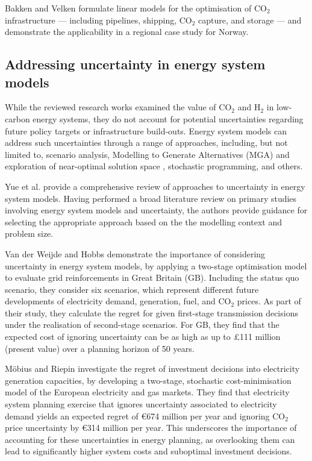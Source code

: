 \documentclass[pdflatex,sn-nature]{sn-jnl}%
\theoremstyle{thmstyleone}%
\theoremstyle{thmstyletwo}%
\theoremstyle{thmstylethree}%
\begin{document}
Bakken and Velken \cite{bakkenLinearModelsOptimization2008} formulate linear models for the optimisation of CO$_2$ infrastructure --- including pipelines, shipping, CO$_2$ capture, and storage --- and demonstrate the applicability in a regional case study for Norway. \cite{birgeValueStochasticSolution1982,birgeIntroductionStochasticProgramming2011,fodstadStochasticModelingNatural2016,vanderweijdeEconomicsPlanningElectricity2012,mobiusRegretAnalysisInvestment2020}

\subsection{Addressing uncertainty in energy system models}\label{sec:uncertainty_in_energy_system_models}
While the reviewed research works examined the value of CO$_2$ and H$_2$ in low-carbon energy systems, they do not account for potential uncertainties regarding future policy targets or infrastructure build-outs. 
Energy system models can address such uncertainties through a range of approaches, including, but not limited to, scenario analysis, Modelling to Generate Alternatives (MGA) and exploration of near-optimal solution space \cite{neumannNearoptimalFeasibleSpace2021,greevenbroekLittleLoseCase2024,priceModellingGenerateAlternatives2017}, stochastic programming, and others. 

Yue et al. \cite{yueReviewApproachesUncertainty2018} provide a comprehensive review of approaches to uncertainty in energy system models. Having performed a broad literature review on primary studies involving energy system models and uncertainty, the authors provide guidance for selecting the appropriate approach based on the the modelling context and problem size.

Van der Weijde and Hobbs \cite{vanderweijdeEconomicsPlanningElectricity2012} demonstrate the importance of considering uncertainty in energy system models, by applying a two-stage optimisation model to evaluate grid reinforcements in Great Britain (GB). Including the status quo scenario, they consider six scenarios, which represent different future developments of electricity demand, generation, fuel, and CO$_2$ prices. As part of their study, they calculate the regret for given first-stage transmission decisions under the realisation of second-stage scenarios. For GB, they find that the expected cost of ignoring uncertainty can be as high as up to \pounds111 million (present value) over a planning horizon of 50 years.

Möbius and Riepin \cite{mobiusRegretAnalysisInvestment2020} investigate the regret of investment decisions into electricity generation capacities, by developing a two-stage, stochastic cost-minimisation model of the European electricity and gas markets. They find that electricity system planning exercise that ignores uncertainty associated to electricity demand yields an expected regret of €674 million per year and ignoring CO$_2$ price uncertainty by €314 million per year. This underscores the importance of accounting for these uncertainties in energy planning, as overlooking them can lead to significantly higher system costs and suboptimal investment decisions. 
\end{document}
